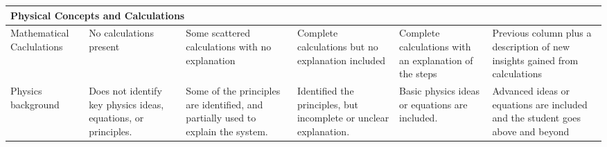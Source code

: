 \documentclass[10pt, letterpaper]{article}
\begin{document}
\begin{landscape}
\begin{tabular}{|p{2cm}|p{4cm}|p{4.5cm}| p{5cm}|p{5.4cm}| p{3.5cm}|}
            \multicolumn{6}{|l|}{\textbf{Physical Concepts and Calculations}}\\ \hline

            \multicolumn{1}{|p{2cm}|}{Mathematical Caclulations} & No calculations present & Some scattered calculations with no explanation & Complete calculations but no explanation included & Complete calculations with an explanation of the steps & Previous column plus a description of new insights gained from calculations \\ \hline

            Physics background & Does   not identify    key physics ideas,  equations,  or principles. & Some   of  the principles  are identified, and partially   used    to  explain the system. & Identified    the principles, but incomplete  or  unclear explanation. & Basic    physics ideas   or  equations   are included.       & Advanced ideas or equations are included and the student goes above and beyond \\ \hline

        \end{tabular}
\end{landscape}
\restoregeometry
\end{document}
